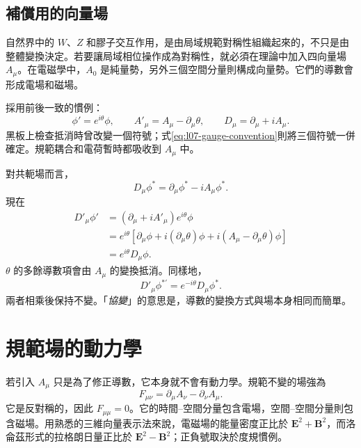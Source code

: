 \subsection{補償用的向量場}

自然界中的 \(W\)、\(Z\) 和膠子交互作用，是由局域規範對稱性組織起來的，不只是由整體變換決定。若要讓局域相位操作成為對稱性，就必須在理論中加入四向量場 \(A_\mu\)。在電磁學中，\(A_0\) 是純量勢，另外三個空間分量則構成向量勢。它們的導數會形成電場和磁場。

採用前後一致的慣例：
\begin{equation}
  \phi'=e^{i\theta}\phi,
  \qquad
  A'_\mu=A_\mu-\partial_\mu\theta,
  \qquad
  D_\mu=\partial_\mu+iA_\mu.
  \label{eq:l07-gauge-convention}
\end{equation}
黑板上檢查抵消時曾改變一個符號；式\eqref{eq:l07-gauge-convention}則將三個符號一併確定。規範耦合和電荷暫時都吸收到 \(A_\mu\) 中。

對共軛場而言，
\begin{equation}
  D_\mu\phi^*=\partial_\mu\phi^*-iA_\mu\phi^*.
\end{equation}
現在
\begin{align}
  D'_\mu\phi'
  &=
  \left(\partial_\mu+iA'_\mu\right)e^{i\theta}\phi
  \nonumber\\
  &=
  e^{i\theta}
  \left[
    \partial_\mu\phi+i(\partial_\mu\theta)\phi
    +i(A_\mu-\partial_\mu\theta)\phi
  \right]
  \nonumber\\
  &=e^{i\theta}D_\mu\phi.
  \label{eq:l07-covariant-transform}
\end{align}
\(\theta\) 的多餘導數項會由 \(A_\mu\) 的變換抵消。同樣地，
\begin{equation}
  D'_\mu\phi^{*\prime}=e^{-i\theta}D_\mu\phi^*.
\end{equation}
兩者相乘後保持不變。「\emph{協變}」的意思是，導數的變換方式與場本身相同而簡單。

\section{規範場的動力學}

若引入 \(A_\mu\) 只是為了修正導數，它本身就不會有動力學。規範不變的場強為
\begin{equation}
  F_{\mu\nu}
  =\partial_\mu A_\nu-\partial_\nu A_\mu.
  \label{eq:l07-field-strength}
\end{equation}
它是反對稱的，因此 \(F_{\mu\mu}=0\)。它的時間--空間分量包含電場，空間--空間分量則包含磁場。用熟悉的三維向量表示法來說，電磁場的能量密度正比於 \(\bm E^2+\bm B^2\)，而洛侖茲形式的拉格朗日量正比於 \(\bm E^2-\bm B^2\)；正負號取決於度規慣例。

